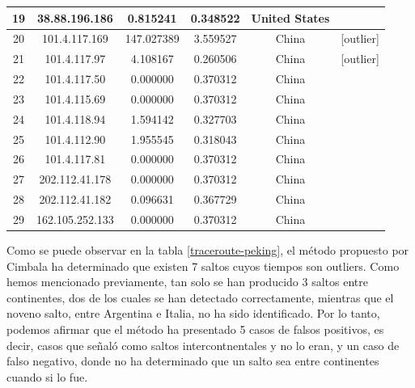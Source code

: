 \begin{table}[!htbp]
\begin{tabular}{|c|c|c|c|c|c|}
19           & 38.88.196.186   & 0.815241     & 0.348522                 & United States    &                   \\ \hline
20           & 101.4.117.169   & 147.027389   & 3.559527                 & China            & {[}outlier{]}     \\ \hline
21           & 101.4.117.97    & 4.108167     & 0.260506                 & China            & {[}outlier{]}     \\ \hline
22           & 101.4.117.50    & 0.000000     & 0.370312                 & China            &                   \\ \hline
23           & 101.4.115.69    & 0.000000     & 0.370312                 & China            &                   \\ \hline
24           & 101.4.118.94    & 1.594142     & 0.327703                 & China            &                   \\ \hline
25           & 101.4.112.90    & 1.955545     & 0.318043                 & China            &                   \\ \hline
26           & 101.4.117.81    & 0.000000     & 0.370312                 & China            &                   \\ \hline
27           & 202.112.41.178  & 0.000000     & 0.370312                 & China            &                   \\ \hline
28           & 202.112.41.182  & 0.096631     & 0.367729                 & China            &                   \\ \hline
29           & 162.105.252.133 & 0.000000     & 0.370312                 & China            &                   \\ \hline
\end{tabular}
\end{table}


Como se puede observar en la tabla \ref{traceroute-peking}, el método propuesto por Cimbala ha determinado que existen 7 saltos cuyos tiempos son outliers. Como hemos mencionado previamente, tan solo se han producido 3 saltos entre continentes, dos de los cuales se han detectado correctamente, mientras que el noveno salto, entre Argentina e Italia, no ha sido identificado. Por lo tanto, podemos afirmar que el método ha presentado 5 casos de falsos positivos, es decir, casos que señaló como saltos intercontnentales y no lo eran, y un caso de falso negativo, donde no ha determinado que un salto sea entre continentes cuando si lo fue.

